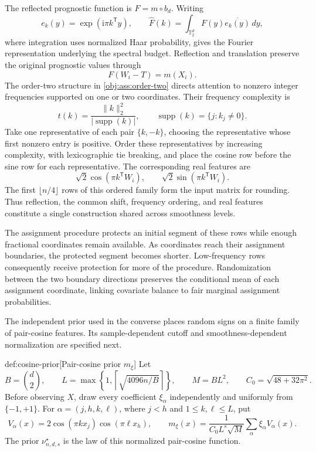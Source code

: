 \documentclass[11pt]{article}
\begin{document}
The reflected prognostic function is \(F=m\circ b_d\). Writing
\[
e_k(y)=\exp(\mathrm i\pi k^{\mathsf T}y),
\qquad
\widehat F(k)=\int_{\mathbb T_2^d}F(y)\overline{e_k(y)}\,dy,
\]
where integration uses normalized Haar probability, gives the Fourier representation underlying the spectral budget. Reflection and translation preserve the original prognostic values through
\[
F(W_i-T)=m(X_i).
\]
The order-two structure in \cref{obj:ass:order-two} directs attention to nonzero integer frequencies supported on one or two coordinates. Their frequency complexity is
\[
t(k)=\frac{\|k\|_2^2}{|\operatorname{supp}(k)|},
\qquad
\operatorname{supp}(k)=\{j:k_j\ne0\}.
\]
Take one representative of each pair \(\{k,-k\}\), choosing the representative whose first nonzero entry is positive. Order these representatives by increasing complexity, with lexicographic tie breaking, and place the cosine row before the sine row for each representative. The corresponding real features are
\[
\sqrt2\cos(\pi k^{\mathsf T}W_i),
\qquad
\sqrt2\sin(\pi k^{\mathsf T}W_i).
\]
The first \(\lfloor n/4\rfloor\) rows of this ordered family form the input matrix for rounding. Thus reflection, the common shift, frequency ordering, and real features constitute a single construction shared across smoothness levels.

The assignment procedure protects an initial segment of these rows while enough fractional coordinates remain available. As coordinates reach their assignment boundaries, the protected segment becomes shorter. Low-frequency rows consequently receive protection for more of the procedure. Randomization between the two boundary directions preserves the conditional mean of each assignment coordinate, linking covariate balance to fair marginal assignment probabilities.

The independent prior used in the converse places random signs on a finite family of pair-cosine features. Its sample-dependent cutoff and smoothness-dependent normalization are specified next.

\begin{definitionv}{def:cosine-prior}[Pair-cosine prior \(m_\xi\)]
Let
\[
B=\binom d2,\qquad
L=\max\left\{1,\left\lceil\sqrt{4096n/B}\right\rceil\right\},\qquad
M=BL^2,\qquad
C_0=\sqrt{48+32\pi^2}.
\]
Before observing \(X\), draw every coefficient \(\xi_\alpha\) independently and uniformly from \(\{-1,+1\}\). For \(\alpha=(j,h,k,\ell)\), where \(j<h\) and \(1\leq k,\ell\leq L\), put
\[
V_\alpha(x)=2\cos(\pi kx_j)\cos(\pi\ell x_h),
\qquad
m_\xi(x)=\frac{1}{C_0L^s\sqrt M}\sum_\alpha\xi_\alpha V_\alpha(x).
\]
The prior \(\nu^\star_{n,d,s}\) is the law of this normalized pair-cosine function.
\end{definitionv}
\end{document}
